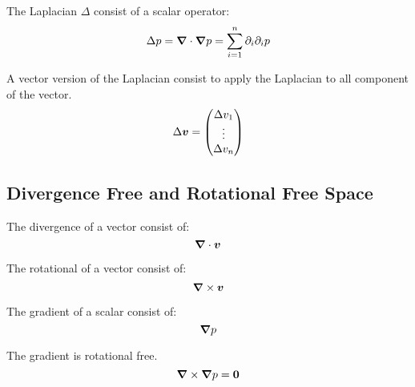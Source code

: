\begin{definition}[Laplacian]
The Laplacian $\Delta$ consist of a scalar operator:
\begin{equation}
\Delta p={\boldsymbol {\nabla}}\cdot {\boldsymbol {\nabla}}p=\sum_{i=1}^{n} \partial_{i}\partial_{i}p
\end{equation}
\end{definition}

\begin{definition}
A vector version of the Laplacian consist to apply the Laplacian to all component of the vector.
\begin{equation}
 \Delta {\boldsymbol {v}}=\begin{pmatrix} \Delta v_{1}\\
                  \vdots\\ \Delta v_{n}
                 \end{pmatrix}
\end{equation}
\end{definition}
\subsection{Divergence Free and Rotational Free Space}

\begin{definition}[Divergence]
 The divergence of a vector consist of:
 \begin{equation}
  {\boldsymbol {\nabla}} \cdot {\boldsymbol {v}}
  \end{equation}
\end{definition}

\begin{definition}[Rotational]
 The rotational of a vector consist of:
 \begin{equation}
  {\boldsymbol {\nabla}} \times {\boldsymbol {v}}
 \end{equation}
\end{definition}

\begin{definition}[Gradient]
 The gradient of a scalar consist of:
 \begin{equation}
  {\boldsymbol {\nabla}} p
 \end{equation}
\end{definition}

\begin{property}
 The gradient is rotational free.
 \begin{equation}
  {\boldsymbol {\nabla}}\times {\boldsymbol {\nabla}} p={\boldsymbol {0}}
 \end{equation}
\end{property}

